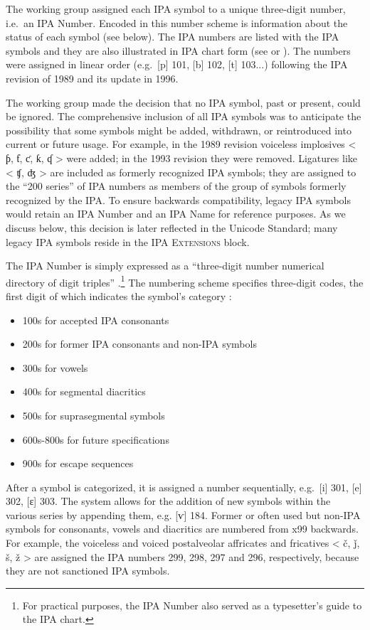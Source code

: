 The working group assigned each IPA symbol to a unique three-digit number, 
i.e.\ an IPA Number. Encoded in this number scheme is information about the 
status of each symbol (see below). The IPA numbers are listed with the IPA 
symbols and they are also illustrated in IPA chart form (see \cite[84]{EslingGaylord1993} 
or \cite[App. 2]{IPA2007}). The numbers were assigned in linear order (e.g.\ 
[p] 101, [b] 102, [t] 103...) following the IPA revision of 1989 and its update in 1996.

The working group made the decision that no IPA symbol, past or present, 
could be ignored. The comprehensive inclusion of all IPA symbols was to 
anticipate the possibility that some symbols might be added, withdrawn, 
or reintroduced into current or future usage. For example, in the 1989 
revision voiceless implosives < ƥ, ƭ, ƈ, ƙ, ʠ > were added; in the 1993 
revision they were removed. Ligatures like < ʧ, ʤ > are included as formerly 
recognized IPA symbols; they are assigned to the ``200 series'' of IPA numbers 
as members of the group of symbols formerly recognized by the IPA. To ensure 
backwards compatibility, legacy IPA symbols would retain an IPA Number and 
an IPA Name for reference purposes. As we discuss below, this decision is 
later reflected in the Unicode Standard; many legacy IPA symbols reside in 
the \textsc{IPA Extensions} block.

The IPA Number is simply expressed as a ``three-digit number numerical 
directory of digit triples'' \cite{}.\footnote{For practical purposes, 
the IPA Number also served as a typesetter's guide to the IPA chart.} 
The numbering scheme specifies three-digit codes, the first digit of which 
indicates the symbol's category \cite{Esling1990,EslingGaylord1993}:

\begin{itemize}
	\item 100s for accepted IPA consonants
	\item 200s for former IPA consonants and non-IPA symbols
	\item 300s for vowels
	\item 400s for segmental diacritics
	\item 500s for suprasegmental symbols
	\item 600s-800s for future specifications
	\item 900s for escape sequences
\end{itemize}

After a symbol is categorized, it is assigned a number sequentially, 
e.g.\ [i] 301, [e] 302, [ɛ] 303. The system allows for the addition 
of new symbols within the various series by appending them, e.g. [ⱱ] 
184. Former or often used but non-IPA symbols for consonants, vowels 
and diacritics are numbered from x99 backwards. For example, the voiceless 
and voiced postalveolar affricates and fricatives < č, ǰ, š, ž > are 
assigned the IPA numbers 299, 298, 297 and 296, respectively, because 
they are not sanctioned IPA symbols.

